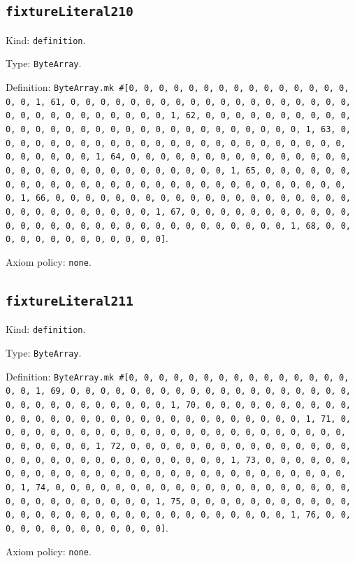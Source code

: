 \documentclass[11pt]{article}
\begin{document}
\subsection*{\texttt{fixtureLiteral210}}
\noindent Kind: \texttt{definition}.\par
\noindent Type: \texttt{ByteArray}.\par
\noindent Definition: \texttt{ByteArray.mk \#[0, 0, 0, 0, 0, 0, 0, 0, 0, 0, 0, 0, 0, 0, 0, 0, 0, 1, 61, 0, 0, 0, 0, 0, 0, 0, 0, 0, 0, 0, 0, 0, 0, 0, 0, 0, 0, 0, 0, 0, 0, 0, 0, 0, 0, 0, 0, 0, 0, 1, 62, 0, 0, 0, 0, 0, 0, 0, 0, 0, 0, 0, 0, 0, 0, 0, 0, 0, 0, 0, 0, 0, 0, 0, 0, 0, 0, 0, 0, 0, 0, 1, 63, 0, 0, 0, 0, 0, 0, 0, 0, 0, 0, 0, 0, 0, 0, 0, 0, 0, 0, 0, 0, 0, 0, 0, 0, 0, 0, 0, 0, 0, 0, 1, 64, 0, 0, 0, 0, 0, 0, 0, 0, 0, 0, 0, 0, 0, 0, 0, 0, 0, 0, 0, 0, 0, 0, 0, 0, 0, 0, 0, 0, 0, 0, 1, 65, 0, 0, 0, 0, 0, 0, 0, 0, 0, 0, 0, 0, 0, 0, 0, 0, 0, 0, 0, 0, 0, 0, 0, 0, 0, 0, 0, 0, 0, 0, 1, 66, 0, 0, 0, 0, 0, 0, 0, 0, 0, 0, 0, 0, 0, 0, 0, 0, 0, 0, 0, 0, 0, 0, 0, 0, 0, 0, 0, 0, 0, 0, 1, 67, 0, 0, 0, 0, 0, 0, 0, 0, 0, 0, 0, 0, 0, 0, 0, 0, 0, 0, 0, 0, 0, 0, 0, 0, 0, 0, 0, 0, 0, 0, 1, 68, 0, 0, 0, 0, 0, 0, 0, 0, 0, 0, 0, 0, 0]}.\par
\noindent Axiom policy: \texttt{none}.\par
\subsection*{\texttt{fixtureLiteral211}}
\noindent Kind: \texttt{definition}.\par
\noindent Type: \texttt{ByteArray}.\par
\noindent Definition: \texttt{ByteArray.mk \#[0, 0, 0, 0, 0, 0, 0, 0, 0, 0, 0, 0, 0, 0, 0, 0, 0, 1, 69, 0, 0, 0, 0, 0, 0, 0, 0, 0, 0, 0, 0, 0, 0, 0, 0, 0, 0, 0, 0, 0, 0, 0, 0, 0, 0, 0, 0, 0, 0, 1, 70, 0, 0, 0, 0, 0, 0, 0, 0, 0, 0, 0, 0, 0, 0, 0, 0, 0, 0, 0, 0, 0, 0, 0, 0, 0, 0, 0, 0, 0, 0, 1, 71, 0, 0, 0, 0, 0, 0, 0, 0, 0, 0, 0, 0, 0, 0, 0, 0, 0, 0, 0, 0, 0, 0, 0, 0, 0, 0, 0, 0, 0, 0, 1, 72, 0, 0, 0, 0, 0, 0, 0, 0, 0, 0, 0, 0, 0, 0, 0, 0, 0, 0, 0, 0, 0, 0, 0, 0, 0, 0, 0, 0, 0, 0, 1, 73, 0, 0, 0, 0, 0, 0, 0, 0, 0, 0, 0, 0, 0, 0, 0, 0, 0, 0, 0, 0, 0, 0, 0, 0, 0, 0, 0, 0, 0, 0, 1, 74, 0, 0, 0, 0, 0, 0, 0, 0, 0, 0, 0, 0, 0, 0, 0, 0, 0, 0, 0, 0, 0, 0, 0, 0, 0, 0, 0, 0, 0, 0, 1, 75, 0, 0, 0, 0, 0, 0, 0, 0, 0, 0, 0, 0, 0, 0, 0, 0, 0, 0, 0, 0, 0, 0, 0, 0, 0, 0, 0, 0, 0, 0, 1, 76, 0, 0, 0, 0, 0, 0, 0, 0, 0, 0, 0, 0, 0]}.\par
\noindent Axiom policy: \texttt{none}.\par
\end{document}
